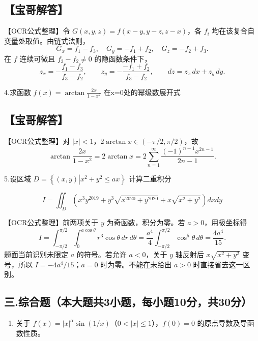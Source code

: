 \documentclass[11pt,fontset=fandol]{ctexart}
\providecommand{\tightlist}{\setlength{\itemsep}{0pt}\setlength{\parskip}{0pt}}
\begin{document}
\subsection{【宝哥解答】}\label{ux5b9dux54e5ux89e3ux7b54-1}

【OCR公式整理】令 \(G(x,y,z)=f(x-y,y-z,z-x)\)，各 \(f_i\)
均在该复合自变量处取值。由链式法则， \[
G_x=f_1-f_3,\quad G_y=-f_1+f_2,\quad G_z=-f_2+f_3.
\] 在 \(f\) 连续可微且 \(f_3-f_2\ne0\) 的隐函数条件下， \[
z_x=-\frac{f_1-f_3}{f_3-f_2},\qquad
z_y=-\frac{-f_1+f_2}{f_3-f_2},\qquad dz=z_x\,dx+z_y\,dy.
\]

4.求函数 \(f ( x ) = \arctan { \frac { 2 x } { 1 - x ^ { 2 } } }\)
在x=0处的幂级数展开式

\subsection{【宝哥解答】}\label{ux5b9dux54e5ux89e3ux7b54-2}

【OCR公式整理】对 \(|x|<1\)，\(2\arctan x\in(-\pi/2,\pi/2)\)，故 \[
\arctan\frac{2x}{1-x^2}=2\arctan x
=2\sum_{n=1}^\infty\frac{(-1)^{n-1}x^{2n-1}}{2n-1}.
\]

5.设区域
\(D = \left\{ ( x , y ) \left| x ^ { 2 } + y ^ { 2 } \leq a x \right. \right\}\)
计算二重积分

\[
I = \iint _ { D } { ( x ^ { 3 } y ^ { 2 0 1 9 } + y ^ { 3 } \sqrt { x ^ { 2 0 2 0 } + y ^ { 2 0 2 0 } } + x \sqrt { x ^ { 2 } + y ^ { 2 } } ) d x d y }
\]

【OCR公式整理】前两项关于 \(y\) 为奇函数，积分为零。若
\(a>0\)，用极坐标得 \[
I=\int_{-\pi/2}^{\pi/2}\int_0^{a\cos\theta}
r^3\cos\theta\,dr\,d\theta
=\frac{a^4}{4}\int_{-\pi/2}^{\pi/2}\cos^5\theta\,d\theta
=\frac{4a^4}{15}.
\] 题面当前识别未限定 \(a\) 的符号。若允许 \(a<0\)，关于 \(y\) 轴反射后
\(x\sqrt{x^2+y^2}\) 变号，所以 \(I=-4a^4/15\)；\(a=0\)
时为零。不能在未给出 \(a>0\) 时直接省去这一区别。

\subsection{三.综合题（本大题共3小题，每小题10分，共30分）}\label{ux4e09.ux7efcux5408ux9898ux672cux5927ux9898ux51713ux5c0fux9898ux6bcfux5c0fux989810ux5206ux517130ux5206}

\begin{enumerate}
\def\labelenumi{\arabic{enumi}.}
\tightlist
\item
  关于 \(f(x)=|x|^\alpha\sin(1/x)\)（\(0<|x|\le1\)），\(f(0)=0\)
  的原点导数及导函数性质。
\end{enumerate}
\end{document}

